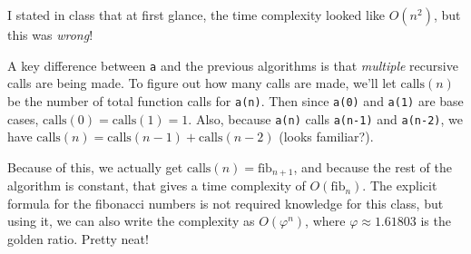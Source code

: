 \documentclass[11pt,letterpaper,dvipsnames]{article}
\begin{document}
I stated in class that at first glance, the time complexity looked like $O(n^2)$, but this was \textit{wrong}!

A key difference between \texttt{a} and the previous algorithms is that \textit{multiple} recursive calls are being made. To figure out how many calls are made, we'll let $\text{calls}(n)$ be the number of total function calls for \texttt{a(n)}. Then since \texttt{a(0)} and \texttt{a(1)} are base cases, $\text{calls}(0)=\text{calls}(1)=1$. Also, because \texttt{a(n)} calls \texttt{a(n-1)} and \texttt{a(n-2)}, we have $\text{calls}(n)=\text{calls}(n-1)+\text{calls}(n-2)$ (looks familiar?).

Because of this, we actually get $\text{calls}(n)=\text{fib}_{n+1}$, and because the rest of the algorithm is constant, that gives a time complexity of $O(\text{fib}_n)$. The explicit formula for the fibonacci numbers is not required knowledge for this class, but using it, we can also write the complexity as $O(\varphi^n)$, where $\varphi \approx 1.61803$ is the golden ratio. Pretty neat!
\end{document}
